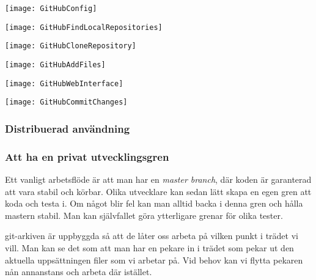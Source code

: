 \documentclass[swedish]{beamer}
\begin{document}
\begin{frame}[fragile]
\texttt{[image: GitHubConfig]}
\end{frame}

\begin{frame}[fragile]
\texttt{[image: GitHubFindLocalRepositories]}
\end{frame}

\begin{frame}
\texttt{[image: GitHubCloneRepository]}
\end{frame}

\begin{frame}[fragile]
\texttt{[image: GitHubAddFiles]}
\end{frame}

\begin{frame}[fragile]
\texttt{[image: GitHubWebInterface]}
\end{frame}

\begin{frame}[fragile]
\texttt{[image: GitHubCommitChanges]}
\end{frame}

\begin{frame}[fragile]
\frametitle{Distribuerad användning}
\end{frame}

\begin{frame}[fragile]

\end{frame}






\begin{frame}[fragile]
\frametitle{Att ha en privat utvecklingsgren}
Ett vanligt arbetsflöde är att man har en \emph{master branch}, där koden är garanterad att vara stabil och körbar.  Olika utvecklare kan sedan lätt skapa en egen gren att koda och testa i.  Om något blir fel kan man alltid backa i denna gren och hålla mastern stabil.  Man kan självfallet göra ytterligare grenar för olika tester.

git-arkiven är uppbyggda så att de låter oss arbeta på vilken punkt i trädet vi vill.  Man kan se det som att man har en pekare in i trädet som pekar ut den aktuella uppsättningen filer som vi arbetar på.  Vid behov kan vi flytta pekaren nån annanstans och arbeta där istället.
\end{frame}
\end{document}
